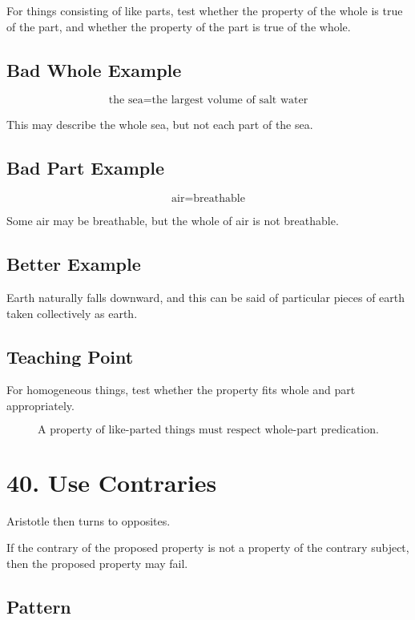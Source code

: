 \documentclass[12pt]{article}
\begin{document}
For things consisting of like parts, test whether the property of the whole is
true of the part, and whether the property of the part is true of the whole.

\subsection*{Bad Whole Example}

\[
\text{the sea} = \text{the largest volume of salt water}
\]

This may describe the whole sea, but not each part of the sea.

\subsection*{Bad Part Example}

\[
\text{air} = \text{breathable}
\]

Some air may be breathable, but the whole of air is not breathable.

\subsection*{Better Example}

Earth naturally falls downward, and this can be said of particular pieces of
earth taken collectively as earth.

\subsection*{Teaching Point}

For homogeneous things, test whether the property fits whole and part
appropriately.

\[
\boxed{
\text{A property of like-parted things must respect whole-part predication.}
}
\]

\section*{40. Use Contraries}

Aristotle then turns to opposites.

If the contrary of the proposed property is not a property of the contrary
subject, then the proposed property may fail.

\subsection*{Pattern}
\end{document}
